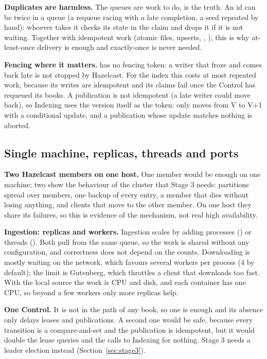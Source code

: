 \textbf{Duplicates are harmless.} The queues are work to do,  is the truth. An id can be twice in a
queue (a requeue racing with a late completion, a seed repeated by hand): whoever takes it checks its state in the
claim and drops it if it is not waiting. Together with idempotent work (atomic files, upserts, ,
), this is why at-least-once delivery is enough and exactly-once is never needed.

\textbf{Fencing where it matters.}  has no fencing token: a writer that froze and comes back late is not
stopped by Hazelcast. For the index this costs at most repeated work, because its writes are idempotent and its claims
fail once the Control has requeued its books. A publication is not idempotent (a late writer could move 
back), so Indexing uses the version itself as the token:  only moves from V to V+1 with a conditional
update, and a publication whose update matches nothing is aborted.

\subsection{Single machine, replicas, threads and ports}

\textbf{Two Hazelcast members on one host.} One member would be enough on one machine; two show the behaviour of the
cluster that Stage 3 needs: partitions spread over members, one backup of every entry, a member that dies without losing
anything, and clients that move to the other member. On one host they share its failures, so this is evidence of the
mechanism, not real high availability.

\textbf{Ingestion: replicas and workers.} Ingestion scales by adding processes () or threads
(). Both pull from the same queue, so the work is shared without any configuration, and
correctness does not depend on the counts. Downloading is mostly waiting on the network, which favours several workers
per process (4 by default); the limit is Gutenberg, which throttles a client that downloads too fast. With the local
source the work is CPU and disk, and each container has one CPU, so beyond a few workers only more replicas help.

\textbf{One Control.} It is not in the path of any book, so one is enough and its absence only delays leases and
publications. A second one would be safe, because every transition is a compare-and-set and the publication is
idempotent, but it would double the lease queries and the calls to Indexing for nothing. Stage 3 needs a leader election
instead (Section~\ref{sec:stage3}).

